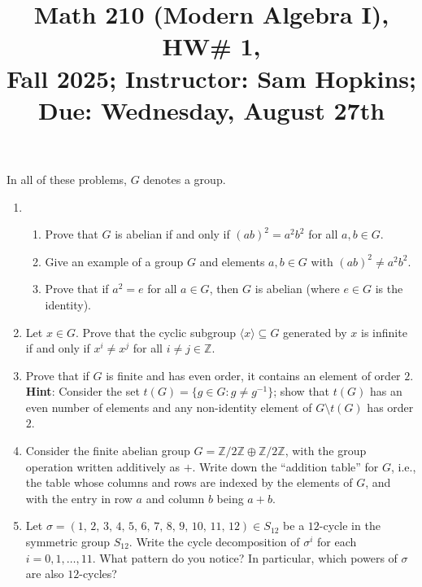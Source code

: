 \documentclass[11pt]{article}
\title{Math 210 (Modern Algebra I), HW\# 1, \\ {\normalsize Fall 2025; Instructor: Sam Hopkins; Due: Wednesday, August 27th}}
\date{}
\begin{document}
\maketitle

\thispagestyle{empty}

In all of these problems, $G$ denotes a group.

\begin{enumerate}

\item \begin{enumerate}
\item Prove that $G$ is abelian if and only if $(ab)^2=a^2b^2$ for all $a,b\in G$. 
\item Give an example of a group $G$ and elements $a,b\in G$ with $(ab)^2\neq a^2b^2$.
\item Prove that if $a^2 = e$ for all $a\in G$, then $G$ is abelian (where $e\in G$ is the identity).
\end{enumerate}

\item Let $x\in G$. Prove that the cyclic subgroup $\langle x \rangle \subseteq G$ generated by $x$ is infinite if and only if $x^{i} \neq x^{j}$ for all $i \neq j \in \mathbb{Z}$.

\item Prove that if $G$ is finite and has even order, it contains an element of order $2$. \\ {\bf Hint}: Consider the set $t(G) = \{g \in G\colon g \neq g^{-1}\}$; show that $t(G)$ has an even number of elements and any non-identity element of $G\setminus t(G)$ has order $2$.

\item Consider the finite abelian group $G = \mathbb{Z}/2\mathbb{Z} \oplus \mathbb{Z}/2\mathbb{Z}$, with the group operation written additively as $+$. Write down the ``addition table'' for $G$, i.e., the table whose columns and rows are indexed by the elements of $G$, and with the entry in row $a$ and column $b$ being $a+b$.

\item Let $\sigma = (1, \, 2, \, 3, \, 4, \, 5, \, 6, \, 7, \, 8, \, 9, \, 10, \, 11, \, 12) \in S_{12}$ be a $12$-cycle in the symmetric group $S_{12}$. Write the cycle decomposition of $\sigma^i$ for each $i=0,1,\ldots,11$. What pattern do you notice? In particular, which powers of $\sigma$ are also $12$-cycles?

\end{enumerate}
\end{document}
